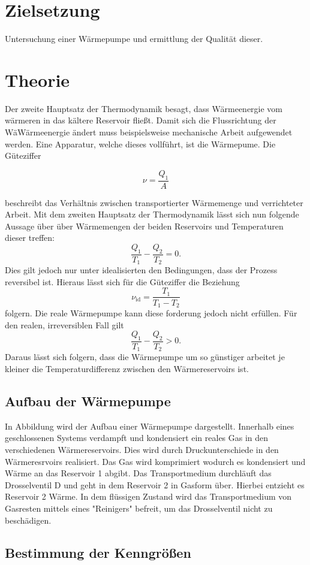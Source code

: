 \section{Zielsetzung}
Untersuchung einer Wärmepumpe und ermittlung der Qualität dieser.
\section{Theorie}
\label{sec:Theorie}

Der zweite Hauptsatz der Thermodynamik besagt, dass Wärmeenergie vom wärmeren in das kältere Reservoir fließt.
Damit sich die Flussrichtung der WäWärmeenergie ändert muss beispielsweise mechanische Arbeit aufgewendet werden.
Eine Apparatur, welche dieses vollführt, ist die Wärmepume.
Die Güteziffer

\begin{equation}
	\label{eq:gl1}
	\nu=\frac{Q_1}{A}
\end{equation}

beschreibt das Verhältnis zwischen transportierter Wärmemenge und verrichteter Arbeit.
Mit dem zweiten Hauptsatz der Thermodynamik lässt sich nun folgende Aussage über über Wärmemengen der beiden Reservoirs und Temperaturen dieser treffen:
\begin{equation}
		\label{eq:gl2}
	\frac{Q_1}{T_1}-\frac{Q_2}{T_2}=0.
\end{equation}
Dies gilt jedoch nur unter idealisierten den Bedingungen, dass der Prozess reversibel ist.
Hieraus lässt sich für die Güteziffer die Beziehung
\begin{equation}
	\nu_{\text{id}}=\frac{T_1}{T_1-T_2}
	\label{eq:guetezifferideal}
\end{equation}
folgern.
Die reale Wärmepumpe kann diese forderung jedoch nicht erfüllen.
Für den realen, irreversiblen Fall gilt
\begin{equation}
		\label{eq:gl3}
	\frac{Q_1}{T_1}-\frac{Q_2}{T_2}>0 .
\end{equation}
Daraus lässt sich folgern, dass die Wärmepumpe um so günstiger arbeitet je kleiner die Temperaturdifferenz zwischen den Wärmereservoirs ist.
\subsection{Aufbau der Wärmepumpe}
\label{sec:AdW}
In Abbildung wird der Aufbau einer Wärmepumpe dargestellt.
Innerhalb eines geschlossenen Systems verdampft und kondensiert ein reales Gas in den verschiedenen Wärmereservoirs.
Dies wird durch Druckunterschiede in den Wärmeresrvoirs realisiert.
Das Gas wird komprimiert wodurch es kondensiert und Wärme an das Reservoir 1 abgibt.
Das Transportmedium durchläuft das Drosselventil D und geht in dem Reservoir 2 in Gasform über.
Hierbei entzieht es Reservoir 2 Wärme.
In dem flüssigen Zustand wird das Transportmedium von Gasresten mittels eines "Reinigers" befreit, um das Drosselventil nicht zu beschädigen.
\subsection{Bestimmung der Kenngrößen}
\label{sec:BdK}
